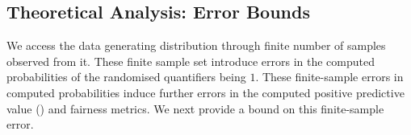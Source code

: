 \begin{comment}
\red{Let $ \bool_i $ and $ \bool_j $ be two Boolean (non-sensitive) features and we want to encode their pair-wise correlation in {\justicia}. For an assignment to $ \bool_i, \bool_j $, we consider a new Boolean variable $ v $ and add a constraint $ v \leftrightarrow \bool_i \wedge \bool_j $ in the CNF $ \phi $ of the SSAT formula $ \Phi $. Additionally, $ v $ is given a randomized quantification in the prefix of $ \Phi $ and the probability of $ v $ is calculated as the probability of both $ \bool_i $ and $ \bool_j $ assigning to $ 1 $ in the distribution $ \mathcal{D} $. Note that, to encode the total correlation of all Boolean features, the mentioned approach introduces exponentially (with the number of features) many new variables and add an exponential number of constraints to $ \phi $ with an aim of computing a more precise satisfying probability of $ \Phi $. Optionally, one can encode the correlation among a selected set of features of interest in {\justicia}. }
\end{comment}


\subsection{Theoretical Analysis: Error Bounds}\label{fairness_justicia_sec:theory}
We access the data generating distribution through  finite number of samples observed from it. These finite sample set introduce errors in the computed probabilities of the randomised quantifiers being $1$. These finite-sample errors in computed probabilities induce further errors in the computed positive predictive value () and fairness metrics. We next provide a bound on this finite-sample error.

